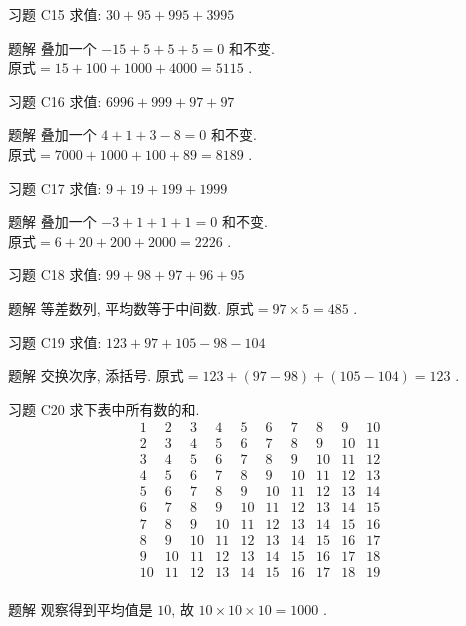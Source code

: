 \documentclass[content.tex]{subfiles}
\begin{document}
\begin{frame}{习题 C15}
求值: $30+95+995+3995$
\begin{exampleblock}{题解}
叠加一个 $-15+5+5+5=0$ 和不变. \\
$\text{原式} = 15+100+1000+4000 = 5115$ .
\end{exampleblock}
\end{frame}

\begin{frame}{习题 C16}
求值: $6996+999+97+97$
\begin{exampleblock}{题解}
叠加一个 $4+1+3-8=0$ 和不变. \\
$\text{原式} = 7000+1000+100+89 = 8189$ .
\end{exampleblock}
\end{frame}

\begin{frame}{习题 C17}
求值: $9+19+199+1999$
\begin{exampleblock}{题解}
叠加一个 $-3+1+1+1=0$ 和不变. \\
$\text{原式} = 6+20+200+2000 = 2226$ .
\end{exampleblock}
\end{frame}

\begin{frame}{习题 C18}
求值: $99+98+97+96+95$
\begin{exampleblock}{题解}
等差数列, 平均数等于中间数. $\text{原式} = 97\times 5 = 485$ .
\end{exampleblock}
\end{frame}

\begin{frame}{习题 C19}
求值: $123+97+105-98-104$
\begin{exampleblock}{题解}
交换次序, 添括号. $\text{原式} = 123+(97-98)+(105-104) = 123$ .
\end{exampleblock}
\end{frame}

\begin{frame}{习题 C20}
求下表中所有数的和.
$$
\begin{matrix}
1 & 2 & 3 & 4 & 5 & 6 & 7 & 8 & 9 & 10 \\
2 & 3 & 4 & 5 & 6 & 7 & 8 & 9 & 10 & 11 \\
3 & 4 & 5 & 6 & 7 & 8 & 9 & 10 & 11 & 12 \\
4 & 5 & 6 & 7 & 8 & 9 & 10 & 11 & 12 & 13 \\
5 & 6 & 7 & 8 & 9 & 10 & 11 & 12 & 13 & 14 \\
6 & 7 & 8 & 9 & 10 & 11 & 12 & 13 & 14 & 15 \\
7 & 8 & 9 & 10 & 11 & 12 & 13 & 14 & 15 & 16 \\
8 & 9 & 10 & 11 & 12 & 13 & 14 & 15 & 16 & 17 \\
9 & 10 & 11 & 12 & 13 & 14 & 15 & 16 & 17 & 18 \\
10 & 11 & 12 & 13 & 14 & 15 & 16 & 17 & 18 & 19 \\
\end{matrix}
$$
\begin{exampleblock}{题解}
观察得到平均值是 $10$, 故 $10\times10\times10=1000$ .
\end{exampleblock}
\end{frame}
\end{document}
